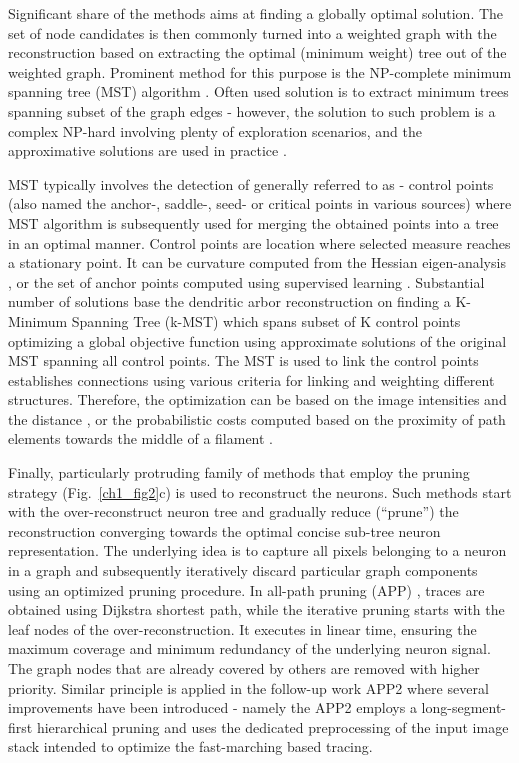 Significant share of the methods aims at finding a globally optimal solution. The set of node candidates is then commonly turned into a weighted graph with the reconstruction based on extracting the optimal (minimum weight) tree out of the weighted graph. Prominent method for this purpose is the NP-complete minimum spanning tree (MST) algorithm \cite{turetken2011automated,yuan2009mdl,gonzalez2010delineating,xie2010automatic}. Often used solution is to extract minimum trees spanning subset of the graph edges - however, the solution to such problem is a complex NP-hard \cite{chimani2009obtaining} involving plenty of exploration scenarios, and the approximative solutions are used in practice \cite{blum2005combining,gonzalez2010delineating}.

MST typically involves the detection of generally referred to as - control points (also named the anchor-, saddle-, seed- or critical points in various sources) where MST algorithm is subsequently used for merging the obtained points into a tree in an optimal manner. Control points are location where selected measure reaches a stationary point. It can be curvature computed from the Hessian eigen-analysis \cite{yuan2009mdl}, or the set of anchor points computed using supervised learning \cite{turetken2011automated}. Substantial number of solutions \cite{gonzalez2010delineating,xie2010automatic,turetken2011automated} base the dendritic arbor reconstruction on finding a K-Minimum Spanning Tree (k-MST) which spans subset of K control points optimizing a global objective function using approximate solutions of the original MST spanning all control points. The MST is used to link the control points establishes connections using various criteria for linking and weighting different structures. Therefore, the optimization can be based on the image intensities and the distance \cite{yuan2009mdl}, or the probabilistic costs computed based on the proximity of path elements towards the middle of a filament \cite{turetken2011automated}.

Finally, particularly protruding family of methods that employ the pruning strategy (Fig.~\ref{ch1_fig2}c) is used to reconstruct the neurons. Such methods start with the over-reconstruct neuron tree and gradually reduce (``prune'') the reconstruction converging towards the optimal concise sub-tree neuron representation. The underlying idea is to capture all pixels belonging to a neuron in a graph and subsequently iteratively discard particular graph components using an optimized pruning procedure. In all-path pruning (APP) \cite{peng2011automatic}, traces are obtained using Dijkstra shortest path, while the iterative pruning starts with the leaf nodes of the over-reconstruction. It executes in linear time, ensuring the maximum coverage and minimum redundancy of the underlying neuron signal. The graph nodes that are already covered by others are removed with higher priority. Similar principle is applied in the follow-up work APP2 \cite{xiao2013app2} where several improvements have been introduced - namely the APP2 employs a long-segment-first hierarchical pruning and uses the dedicated preprocessing of the input image stack intended to optimize the fast-marching based tracing. 

